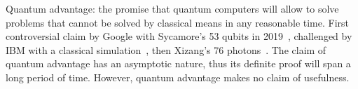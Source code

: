 Quantum advantage: the promise that quantum
computers will allow to solve problems that cannot be solved by
classical means in any reasonable time. First controversial claim by
Google with Sycamore's 53 qubits in 2019~\cite{AruteEtAl19},
challenged by IBM with a classical simulation~\cite{PednaultEtAl19},
then Xizang's 76 photons~\cite{ZhongEtAl20a}.
The claim of quantum advantage has an asymptotic nature, thus
its definite proof will span a long period of time. However, quantum
advantage makes no claim of usefulness.

%
%
%
%
%
